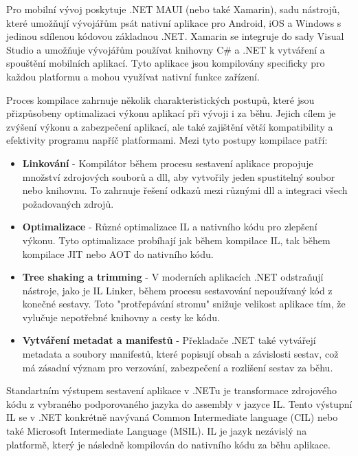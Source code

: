 
Pro mobilní vývoj poskytuje .NET MAUI (nebo také Xamarin), sadu nástrojů, které umožňují vývojářům psát nativní aplikace pro Android, iOS a Windows s jedinou sdílenou kódovou základnou .NET. Xamarin se integruje do sady Visual Studio a umožňuje vývojářům používat knihovny C\# a .NET k vytváření a spouštění mobilních aplikací. Tyto aplikace jsou kompilovány specificky pro každou platformu a mohou využívat nativní funkce zařízení.


Proces kompilace zahrnuje několik charakteristických postupů, které jsou přizpůsobeny optimalizaci výkonu aplikací při vývoji i za běhu. Jejich cílem je zvýšení výkonu a zabezpečení aplikací, ale také zajištění větší kompatibility a efektivity programu napříč platformami. Mezi tyto postupy kompilace patří:

\begin{itemize}
    \item \textbf{Linkování} - Kompilátor během procesu sestavení aplikace propojuje množství zdrojových souborů a dll, aby vytvořily jeden spustitelný soubor nebo knihovnu. To zahrnuje řešení odkazů mezi různými dll a integraci všech požadovaných zdrojů.
    \item \textbf{Optimalizace} - Různé optimalizace IL a nativního kódu pro zlepšení výkonu. Tyto optimalizace probíhají jak během kompilace IL, tak během kompilace JIT nebo AOT do nativního kódu.
    \item \textbf{Tree shaking a trimming} - V moderních aplikacích .NET odstraňují nástroje, jako je IL Linker, během procesu sestavování nepoužívaný kód z konečné sestavy. Toto "protřepávání stromu" snižuje velikost aplikace tím, že vylučuje nepotřebné knihovny a cesty ke kódu.
    \item \textbf{Vytváření metadat a manifestů} - Překladače .NET také vytvářejí metadata a soubory manifestů, které popisují obsah a závislosti sestav, což má zásadní význam pro verzování, zabezpečení a rozlišení sestav za běhu.
\end{itemize}


Standartním výstupem sestavení aplikace v .NETu je transformace zdrojového kódu z vybraného podporovaného jazyka do assembly v jazyce IL. Tento výstupní IL se v .NET konkrétně navývaná Common Intermediate language (CIL) nebo také Microsoft Intermediate Language (MSIL). IL je jazyk nezávislý na platformě, který je následně kompilován do nativního kódu za běhu aplikace.

